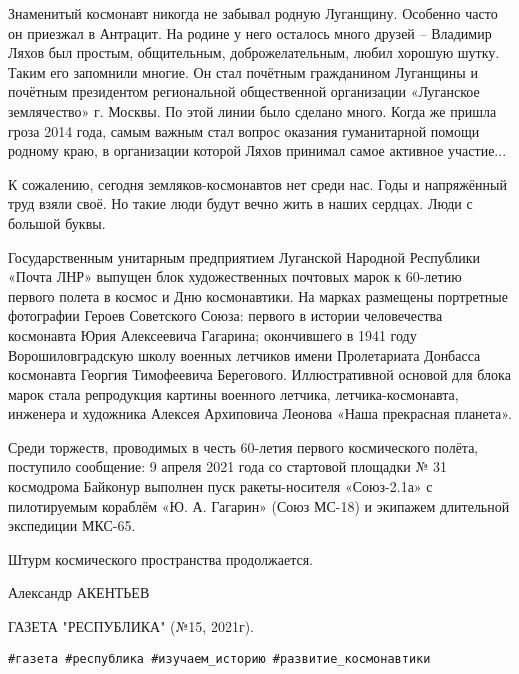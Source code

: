 Знаменитый космонавт никогда не забывал родную Луганщину. Особенно часто он
приезжал в Антрацит. На родине у него осталось много друзей – Владимир Ляхов
был простым, общительным, доброжелательным, любил хорошую шутку. Таким его
запомнили многие. Он стал почётным гражданином Луганщины и почётным президентом
региональной общественной организации «Луганское землячество» г. Москвы. По
этой линии было сделано много. Когда же пришла гроза 2014 года, самым важным
стал вопрос оказания гуманитарной помощи родному краю, в организации которой
Ляхов принимал самое активное участие...

К сожалению, сегодня земляков-космонавтов нет среди нас. Годы и напряжённый
труд взяли своё. Но такие люди будут вечно жить в наших сердцах. Люди с большой
буквы.

Государственным унитарным предприятием Луганской Народной Республики «Почта
ЛНР» выпущен блок художественных почтовых марок к 60-летию первого полета в
космос и Дню космонавтики. На марках размещены портретные фотографии Героев
Советского Союза: первого в истории человечества космонавта Юрия Алексеевича
Гагарина; окончившего в 1941 году Ворошиловградскую школу военных летчиков
имени Пролетариата Донбасса космонавта Георгия Тимофеевича Берегового.
Иллюстративной основой для блока марок стала репродукция картины военного
летчика, летчика-космонавта, инженера и художника Алексея Архиповича Леонова
«Наша прекрасная планета».

Среди торжеств, проводимых в честь 60-летия первого космического полёта,
поступило сообщение: 9 апреля 2021 года со стартовой площадки № 31 космодрома
Байконур выполнен пуск ракеты-носителя «Союз-2.1а» с пилотируемым кораблём «Ю.
А. Гагарин» (Союз МС-18) и экипажем длительной экспедиции МКС-65. 

Штурм космического пространства продолжается.

Александр АКЕНТЬЕВ

ГАЗЕТА "РЕСПУБЛИКА" (№15, 2021г).

\verb|#газета #республика #изучаем_историю #развитие_космонавтики|
